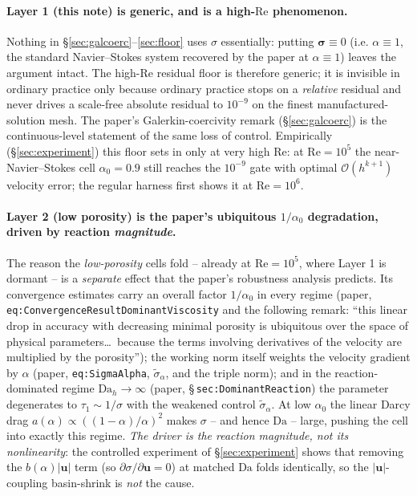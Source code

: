 \documentclass[11pt]{article}
\newcommand{\bu}{\boldsymbol{u}}
\newcommand{\bsig}{\boldsymbol{\sigma}}
\newcommand{\sigtil}{\widetilde{\sigma}_{\alpha}}
\newcommand{\Reyn}{\mathrm{Re}}
\newcommand{\Damk}{\mathrm{Da}}
\newcommand{\bigOh}{\mathcal{O}}
\begin{document}
\paragraph{Layer 1 (this note) is generic, and is a high-$\Reyn$ phenomenon.}
Nothing in \S\ref{sec:galcoerc}--\ref{sec:floor} uses $\sigma$ essentially:
putting $\bsig\equiv0$ (i.e. $\alpha\equiv1$, the standard Navier--Stokes system
recovered by the paper at $\alpha\equiv1$) leaves the argument intact. The
high-$\Reyn$ residual floor is therefore generic; it is invisible in ordinary
practice only because ordinary practice stops on a \emph{relative} residual and
never drives a scale-free absolute residual to $10^{-9}$ on the finest
manufactured-solution mesh. The paper's Galerkin-coercivity remark
(\S\ref{sec:galcoerc}) is the continuous-level statement of the same loss of
control. Empirically (\S\ref{sec:experiment}) this floor sets in only at very high
$\Reyn$: at $\Reyn=10^5$ the near-Navier--Stokes cell $\alpha_0=0.9$ still reaches
the $10^{-9}$ gate with optimal $\bigOh(h^{k+1})$ velocity error; the regular
harness first shows it at $\Reyn=10^6$.

\paragraph{Layer 2 (low porosity) is the paper's ubiquitous $1/\alpha_0$ degradation,
driven by reaction \emph{magnitude}.}
The reason the \emph{low-porosity} cells fold -- already at $\Reyn=10^5$, where
Layer 1 is dormant -- is a \emph{separate} effect that the paper's robustness
analysis predicts. Its convergence estimates carry an overall factor $1/\alpha_0$
in every regime (paper, \texttt{eq:ConvergenceResultDominantViscosity} and the
following remark: ``this linear drop in accuracy with decreasing minimal porosity
is ubiquitous over the space of physical parameters\dots\ because the terms
involving derivatives of the velocity are multiplied by the porosity''); the
working norm itself weights the velocity gradient by $\alpha$ (paper,
\texttt{eq:SigmaAlpha}, $\sigtil$, and the triple norm); and in the
reaction-dominated regime $\Damk_h\to\infty$ (paper, \S\,\texttt{sec:DominantReaction})
the parameter degenerates to $\tau_1\sim1/\sigma$ with the weakened control
$\sigtil$. At low $\alpha_0$ the linear Darcy drag $a(\alpha)\propto((1-\alpha)/\alpha)^2$
makes $\sigma$ -- and hence $\Damk$ -- large, pushing the cell into exactly this
regime. \emph{The driver is the reaction magnitude, not its nonlinearity}: the
controlled experiment of \S\ref{sec:experiment} shows that removing the
$b(\alpha)|\bu|$ term (so $\partial\sigma/\partial\bu=0$) at matched $\Damk$ folds
identically, so the $|\bu|$-coupling basin-shrink is \emph{not} the cause.
\end{document}
